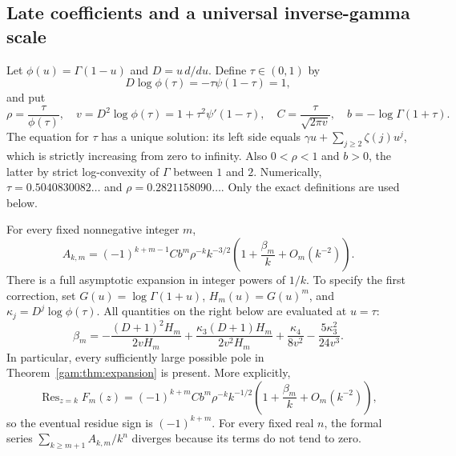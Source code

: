 \subsection{Late coefficients and a universal inverse-gamma scale}

Let $\phi(u)=\Gamma(1-u)$ and $D=u\,d/du$.  Define $\tau\in(0,1)$ by
\begin{equation}\label{gam:eq:critical}
 D\log\phi(\tau)=-\tau\psi(1-\tau)=1,
\end{equation}
and put
\begin{equation}\label{gam:eq:constants}
 \rho=\frac{\tau}{\phi(\tau)},\quad
 v=D^2\log\phi(\tau)=1+\tau^2\psi'(1-\tau),\quad
 C=\frac{\tau}{\sqrt{2\pi v}},\quad
 b=-\log\Gamma(1+\tau).
\end{equation}
The equation for $\tau$ has a unique solution: its left side equals
$\gamma u+\sum_{j\ge2}\zeta(j)u^j$, which is strictly increasing from
zero to infinity.  Also $0<\rho<1$ and $b>0$, the latter by strict
log-convexity of $\Gamma$ between $1$ and $2$.  Numerically,
$\tau=0.5040830082\ldots$ and $\rho=0.2821158090\ldots$.
Only the exact definitions are used below.

\begin{theorem}\label{gam:thm:late}
For every fixed nonnegative integer $m$,
\begin{equation}\label{gam:eq:late}
 A_{k,m}=(-1)^{k+m-1}C b^m\rho^{-k}k^{-3/2}
 \left(1+\frac{\beta_m}{k}+O_m(k^{-2})\right).
\end{equation}
There is a full asymptotic expansion in integer powers of $1/k$.
To specify the first correction, set
$G(u)=\log\Gamma(1+u)$, $H_m(u)=G(u)^m$, and
$\kappa_j=D^j\log\phi(\tau)$.  All quantities on the right below
are evaluated at $u=\tau$:
\begin{equation}\label{gam:eq:beta}
 \beta_m=
 -\frac{(D+1)^2H_m}{2vH_m}
 +\frac{\kappa_3(D+1)H_m}{2v^2H_m}
 +\frac{\kappa_4}{8v^2}
 -\frac{5\kappa_3^2}{24v^3}.
\end{equation}
In particular, every sufficiently large possible pole in
Theorem~\ref{gam:thm:expansion} is present.  More explicitly,
\[
 \operatorname{Res}_{z=k}F_m(z)
 =(-1)^{k+m}C b^m\rho^{-k}k^{-1/2}
   \left(1+\frac{\beta_m}{k}+O_m(k^{-2})\right),
\]
so the eventual residue sign is $(-1)^{k+m}$.  For every fixed real $n$, the formal series
$\sum_{k\ge m+1}A_{k,m}/k^n$ diverges because its terms do not tend to zero.
\end{theorem}

